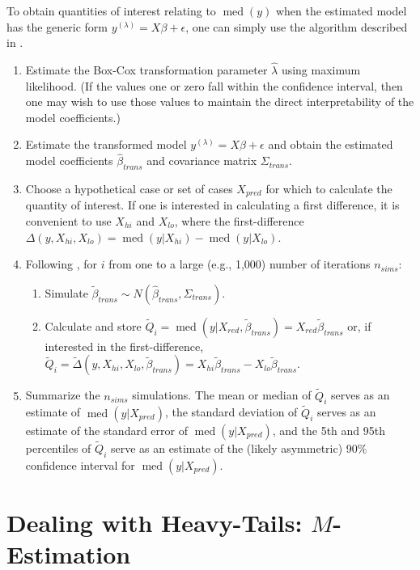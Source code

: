 \documentclass[12pt]{article}
\DeclareMathOperator{\med}{med}
\begin{document}
To obtain quantities of interest relating to $\med(y)$ when the estimated model has the generic form $y^{(\lambda)} = X\beta + \epsilon$, one can simply use the algorithm described in \cite{KingTomzWittenberg2000}.
\begin{enumerate}
\item Estimate the Box-Cox transformation parameter $\hat{\lambda}$ using maximum likelihood. 
(If the values one or zero fall within the confidence interval, then one may wish to use those values to maintain the direct interpretability of the model coefficients.)
\item Estimate the transformed model $y^{(\lambda)} = X\beta + \epsilon$ and obtain the estimated model coefficients $\hat{\beta}_{trans}$ and covariance matrix $\Sigma_{trans}$.
\item Choose a hypothetical case or set of cases $X_{pred}$ for which to calculate the quantity of interest. 
If one is interested in calculating a first difference, it is convenient to use $X_{hi}$ and $X_{lo}$, where the first-difference $\Delta(y, X_{hi}, X_{lo}) = \med(y | X_{hi}) - \med(y | X_{lo})$.
\item Following \cite{KingTomzWittenberg2000}, for $i$ from one to a large (e.g., 1,000) number of iterations $n_{sims}$:
        \begin{enumerate}
        \item Simulate $\tilde{\beta}_{trans} \sim N\left(\hat{\beta}_{trans}, \Sigma_{trans}\right)$.
        \item Calculate and store $\tilde{Q}_i = \med(y | X_{red}, \tilde{\beta}_{trans}) = X_{red}\tilde{\beta}_{trans}$ or, if interested in the first-difference, $\tilde{Q}_i = \tilde{\Delta}(y, X_{hi}, X_{lo}, \tilde{\beta}_{trans}) = X_{hi}\tilde{\beta}_{trans} - X_{lo}\tilde{\beta}_{trans}$.
        \end{enumerate}
\item Summarize the $n_{sims}$ simulations. 
The mean or median of $\tilde{Q}_i$ serves as an estimate of $\med(y | X_{pred})$, the standard deviation of $\tilde{Q}_i$ serves as an estimate of the standard error of $\med(y | X_{pred})$, and the 5th and 95th percentiles of $\tilde{Q}_i$ serve as an estimate of the (likely asymmetric) 90\% confidence interval for $\med(y | X_{pred})$.
\end{enumerate}

\section*{Dealing with Heavy-Tails: $M$-Estimation}
\end{document}
